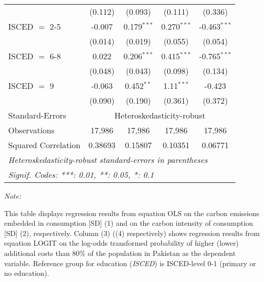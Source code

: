 \begin{table}[htbp!]
\begin{adjustbox}{width = 1\textwidth, max height = 0.95\textheight, center}
\begin{threeparttable}[b]
\begin{tabular}{lcccc}
                                 & (0.112)            & (0.093)            & (0.111)        & (0.336)\\   
            ISCED $=$ 2-5        & -0.007             & 0.179$^{***}$      & 0.270$^{***}$  & -0.463$^{***}$\\   
                                 & (0.014)            & (0.019)            & (0.055)        & (0.054)\\   
            ISCED $=$ 6-8        & 0.022              & 0.206$^{***}$      & 0.415$^{***}$  & -0.765$^{***}$\\   
                                 & (0.048)            & (0.043)            & (0.098)        & (0.134)\\   
            ISCED $=$ 9          & -0.063             & 0.452$^{**}$       & 1.11$^{***}$   & -0.423\\   
                                 & (0.090)            & (0.190)            & (0.361)        & (0.372)\\   
            \midrule 
            Standard-Errors & \multicolumn{4}{c}{Heteroskedasticity-robust} \\ 
            Observations         & 17,986             & 17,986             & 17,986         & 17,986\\  
            Squared Correlation  & 0.38693            & 0.15807            & 0.10351        & 0.06771\\  
            \midrule \midrule
            \multicolumn{5}{l}{\emph{Heteroskedasticity-robust standard-errors in parentheses}}\\
            \multicolumn{5}{l}{\emph{Signif. Codes: ***: 0.01, **: 0.05, *: 0.1}}\\
         \end{tabular}
         
         \begin{tablenotes}\item \medskip \textit{Note:}
            \item This table displays regression results from equation OLS on the carbon emissions embedded in consumption [SD] (1) and on the carbon intensity of consumption [SD] (2), respectively. 
                                      Column (3) ((4) respectively) shows regression results from equation LOGIT on the log-odds transformed probability of higher (lower) additional costs than 80\% of the population in Pakistan as the dependent variable. Reference group for education (\textit{ISCED}) is ISCED-level 0-1 (primary or no education).
         \end{tablenotes}
      \end{threeparttable}
   \end{adjustbox}
\end{table}


